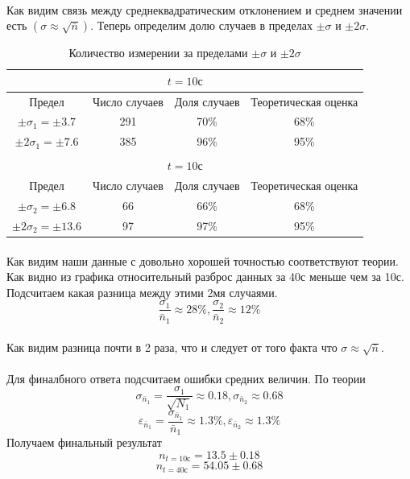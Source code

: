 \documentclass[a4paper, 12pt]{article}
\begin{document}
    \paragraph{}
    Как видим связь между среднеквадратическим отклонением и среднем значении есть $(\sigma \approx \sqrt{\bar{n}})$.
    Теперь определим долю случаев в пределах $\pm\sigma$ и $\pm2\sigma$.

    \begin{table}[H]
    \begin{center}
    \begin{tabular}{|c|c|c|c|}\hline
    \multicolumn{4}{|c|}{$t=10с$}\\\hline
    Предел & Число случаев & Доля случаев & Теоретическая оценка\\\hline
    $\pm \sigma_1 = \pm 3.7$ & 291 & 70\% & 68\% \\
    $\pm 2\sigma_1 = \pm 7.6$ & 385 & 96\% & 95\% \\\hline
    \multicolumn{4}{c}{}\\\hline
    \multicolumn{4}{|c|}{$t=10с$}\\\hline
    Предел & Число случаев & Доля случаев & Теоретическая оценка\\\hline
    $\pm \sigma_2 = \pm 6.8$ & 66 & 66\% & 68\% \\
    $\pm 2\sigma_2 = \pm 13.6$ & 97 & 97\% & 95\% \\\hline

    \end{tabular}
    \caption{Количество измерении за пределами $\pm\sigma$ и $\pm2\sigma$}
    \end{center}
    \end{table}

    \paragraph{}
    Как видим наши данные с довольно хорошей точностью соответствуют теории. Как видно из графика относительный разброс данных за 40с меньше чем за 10с. Подсчитаем какая разница между этими 2мя случаями.
    \[\frac{\sigma_1}{\bar{n}_1} \approx 28\%, \frac{\sigma_2}{\bar{n}_2} \approx 12\%\]
    \paragraph{}
    Как видим разница почти в 2 раза, что и следует от того факта что $\sigma \approx \sqrt{\bar{n}}$.
    \paragraph{}
    Для финалбного ответа подсчитаем ошибки средних величин. По теории
    \[\sigma_{\bar{n}_1} = \frac{\sigma_{1}}{\sqrt{N_1}} \approx 0.18, \sigma_{\bar{n}_2} \approx 0.68\]
    \[\varepsilon_{\bar{n}_1} = \frac{\sigma_{\bar{n}_1}}{\bar{n}_1}\approx 1.3\%, \varepsilon_{\bar{n}_2}\approx 1.3\%\]
    Получаем финальный результат
    \[n_{t=10с}=13.5 \pm 0.18\]
    \[n_{t=40с}=54.05 \pm 0.68\]
\end{document}
